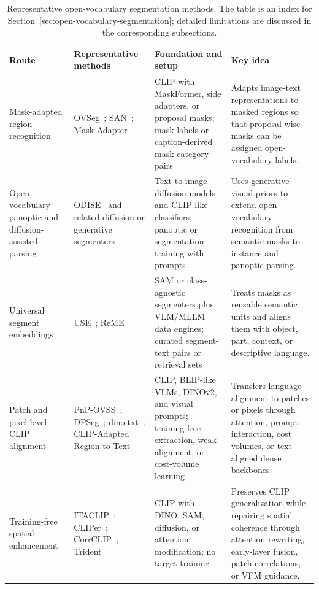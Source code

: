 \begin{table}[t]
\centering
\small
\setlength{\tabcolsep}{5pt}
\renewcommand{\arraystretch}{1.34}
\caption{Representative open-vocabulary segmentation methods. The table is an index for Section~\ref{sec:open-vocabulary-segmentation}; detailed limitations are discussed in the corresponding subsections.}
\label{tab:open-vocab-methods}
\begin{tabularx}{\textwidth}{>{\raggedright\arraybackslash}p{}>{\raggedright\arraybackslash}X>{\raggedright\arraybackslash}p{}>{\raggedright\arraybackslash}p{}}
\toprule
Route & Representative methods & Foundation and setup & Key idea \\
\midrule
Mask-adapted region recognition & OVSeg~\citep{liang2023ovseg}; SAN~\citep{xu2023san}; Mask-Adapter~\citep{yliMaskadapterDevilMasks2025} & CLIP with MaskFormer, side adapters, or proposal masks; mask labels or caption-derived mask-category pairs & Adapts image-text representations to masked regions so that proposal-wise masks can be assigned open-vocabulary labels. \\
Open-vocabulary panoptic and diffusion-assisted parsing & ODISE~\citep{xu2023odise} and related diffusion or generative segmenters & Text-to-image diffusion models and CLIP-like classifiers; panoptic or segmentation training with prompts & Uses generative visual priors to extend open-vocabulary recognition from semantic masks to instance and panoptic parsing. \\
Universal segment embeddings & USE~\citep{xwangUseUniversalSegment2024}; ReME~\citep{xxuanReMEDataCentricFramework2025} & SAM or class-agnostic segmenters plus VLM/MLLM data engines; curated segment-text pairs or retrieval sets & Treats masks as reusable semantic units and aligns them with object, part, context, or descriptive language. \\
Patch and pixel-level CLIP alignment & PnP-OVSS~\citep{luo2024pnpovss}; DPSeg~\citep{zzhaoDPSegDualpromptCost2025}; dino.txt~\citep{joseDinov2MeetsText2025}; CLIP-Adapted Region-to-Text~\citep{gejCLIPAdaptedRegiontoTextLearning2025} & CLIP, BLIP-like VLMs, DINOv2, and visual prompts; training-free extraction, weak alignment, or cost-volume learning & Transfers language alignment to patches or pixels through attention, prompt interaction, cost volumes, or text-aligned dense backbones. \\
Training-free spatial enhancement & ITACLIP~\citep{maaydinItaclipBoostingTrainingfree2025}; CLIPer~\citep{lsunCliperHierarchicallyImproving2025}; CorrCLIP~\citep{dzhangCorrclipReconstructingPatch2025}; Trident~\citep{shiyHarnessingVisionFoundation2025} & CLIP with DINO, SAM, diffusion, or attention modification; no target training & Preserves CLIP generalization while repairing spatial coherence through attention rewriting, early-layer fusion, patch correlations, or VFM guidance. \\

\end{tabularx}
\end{table}
